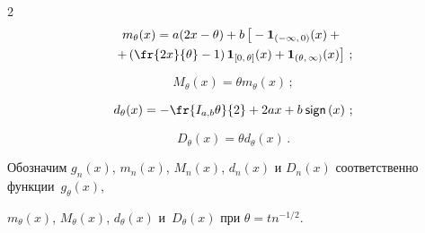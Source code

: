 \begin{multicols}{2}
\begin{multline}


m_{\theta}(x) = a(2x - \theta) + b


\left[ \vphantom{\fr{2x}{\theta}}


-{\III}_{(-\infty,\,0)}(x) +{}\right.\\


{}\left.+ \left(\fr{2x}{\theta} - 1\right){\III}_{[0,\,\theta]}(x) + 


{\III}_{(\theta,\,\infty)}(x)\right]\,;


\label{l9}


\end{multline}





\vspace*{-6pt}





\noindent


\begin{equation}


M_{\theta}(x) = \theta m_{\theta}(x)\,;


\label{l10}


\end{equation}





\vspace*{-6pt}





\noindent


\begin{equation*}


d_{\theta}(x) = -\fr{\iab \theta}{2} + 2ax+b\sign{x}\,;




\end{equation*}


\begin{equation*}


D_{\theta}(x) = \theta d_{\theta}(x)\,.




\end{equation*}


Обозначим $g_n(x)$, $m_n(x)$, $M_n(x)$, $d_n(x)$ и $D_n(x)$ соответственно функции~$g_{\theta}(x)$, 


$m_{\theta}(x)$,  $M_{\theta}(x)$, $d_{\theta}(x)$ и~$D_{\theta}(x)$ при $\theta=tn^{-1/2}$.






\end{multicols}
